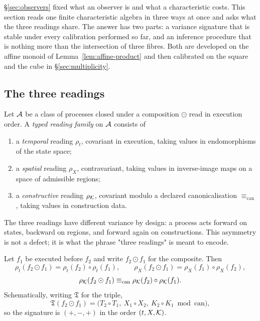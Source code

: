 \label{sec:triadic-inference-body}

\S\ref{sec:observers} fixed what an observer is and what a characteristic costs.
This section reads one finite characteristic algebra in three ways at once and asks
what the three readings share.  The answer has two parts: a variance signature that is
stable under every calibration performed so far, and an inference procedure that is
nothing more than the intersection of three fibres.  Both are developed on the
affine monoid of Lemma~\ref{lem:affine-product} and then calibrated on the square and
the cube in \S\ref{sec:multiplicity}.

\subsection{The three readings}

\begin{definition}\label{def:typed-readings}
Let $\mathcal A$ be a class of processes closed under a composition $\odot$ read in execution
order.  A \emph{typed reading family} on $\mathcal A$ consists of
\begin{enumerate}
\item a \emph{temporal} reading $\rho_t$, covariant in execution, taking values in
  endomorphisms of the state space;
\item a \emph{spatial} reading $\rho_X$, contravariant, taking values in inverse-image
  maps on a space of admissible regions;
\item a \emph{constructive} reading $\rho_\mathcal K$, covariant modulo a declared
  canonicalisation $\equiv_{\mathrm{can}}$, taking values in construction data.
\end{enumerate}
\end{definition}

The three readings have different variance by design: a process acts forward on states,
backward on regions, and forward again on constructions.  This asymmetry is not a
defect; it is what the phrase "three readings" is meant to encode.

\begin{proposition}\label{prop:variance-signature}
Let $f_1$ be executed before $f_2$ and write $f_2\odot f_1$ for the composite.  Then
\[
  \rho_t(f_2\odot f_1)=\rho_t(f_2)\circ\rho_t(f_1),\qquad
  \rho_X(f_2\odot f_1)=\rho_X(f_1)\circ\rho_X(f_2),
\]
\[
  \rho_\mathcal K(f_2\odot f_1)\equiv_{\mathrm{can}}\rho_\mathcal K(f_2)\circ\rho_\mathcal K(f_1).
\]
Schematically, writing $\mathfrak T$ for the triple,
\[
  \mathfrak T(f_2\odot f_1)=\bigl(T_2\circ T_1,\ X_1\circ X_2,\ K_2\circ K_1
  \bmod \mathrm{can}\bigr),
\]
so the signature is $({+},{-},{+})$ in the order $(t,X,\mathcal K)$.
\end{proposition}

